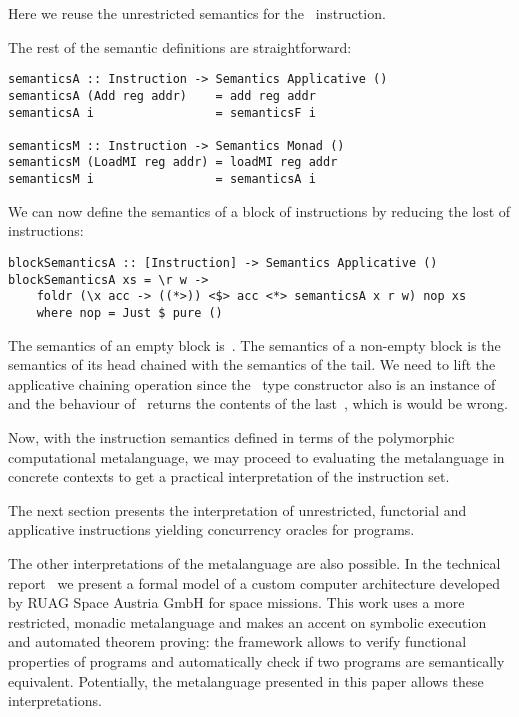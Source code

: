 \noindent Here we reuse the unrestricted semantics for the~ instruction.

The rest of the semantic definitions are straightforward:

\begin{verbatim}
semanticsA :: Instruction -> Semantics Applicative ()
semanticsA (Add reg addr)    = add reg addr
semanticsA i                 = semanticsF i

semanticsM :: Instruction -> Semantics Monad ()
semanticsM (LoadMI reg addr) = loadMI reg addr
semanticsM i                 = semanticsA i
\end{verbatim}

We can now define the semantics of a block of instructions by reducing
the lost of instructions:

\begin{verbatim}
blockSemanticsA :: [Instruction] -> Semantics Applicative ()
blockSemanticsA xs = \r w ->
    foldr (\x acc -> ((*>)) <$> acc <*> semanticsA x r w) nop xs
    where nop = Just $ pure ()
\end{verbatim}

\noindent The semantics of an empty block is~. The semantics of a non-empty
block is the semantics of its head chained with the semantics of the tail. We
need to lift the applicative chaining operation since the~ type constructor
also is an instance of~ and the behaviour of~\hs{*>} returns
the contents of the last~, which is would be wrong.

Now, with the instruction semantics defined in terms of the polymorphic
computational metalanguage, we may proceed to evaluating the metalanguage
in concrete contexts to get a practical interpretation of the instruction set.

The next section presents the interpretation of unrestricted, functorial and
applicative instructions yielding concurrency oracles for programs.

The other interpretations of the metalanguage are also possible. In the technical
report~\cite{mokhov2018formal} we present a formal model of a custom computer
architecture developed by RUAG Space Austria GmbH for space missions.
This work uses a more restricted, monadic metalanguage and makes an accent on
symbolic execution and automated theorem proving: the framework allows to verify
functional properties of programs and automatically check if two programs are
semantically equivalent. Potentially, the metalanguage presented in this paper
allows these interpretations.